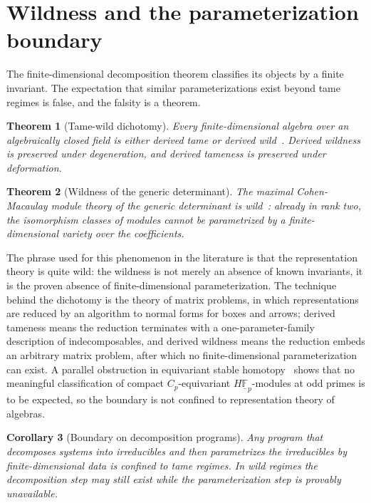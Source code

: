 \documentclass[11pt,letterpaper]{article}
\newtheorem{theorem}{Theorem}[section]
\newtheorem{corollary}[theorem]{Corollary}
\theoremstyle{definition}
\theoremstyle{remark}
\begin{document}
\section{Wildness and the parameterization boundary}

The finite-dimensional decomposition theorem classifies its objects by a finite invariant. The expectation that similar parameterizations exist beyond tame regimes is false, and the falsity is a theorem.

\begin{theorem}[Tame-wild dichotomy]
\label{thm:tame-wild}
Every finite-dimensional algebra over an algebraically closed field is either derived tame or derived wild~\cite{bekkert-drozd}. Derived wildness is preserved under degeneration, and derived tameness is preserved under deformation.
\end{theorem}

\begin{theorem}[Wildness of the generic determinant]
\label{thm:wild-generic-det}
The maximal Cohen-Macaulay module theory of the generic determinant is wild~\cite{buchweitz-leuschke}: already in rank two, the isomorphism classes of modules cannot be parametrized by a finite-dimensional variety over the coefficients.
\end{theorem}

The phrase used for this phenomenon in the literature is that the representation theory is quite wild: the wildness is not merely an absence of known invariants, it is the proven absence of finite-dimensional parameterization. The technique behind the dichotomy is the theory of matrix problems, in which representations are reduced by an algorithm to normal forms for boxes and arrows; derived tameness means the reduction terminates with a one-parameter-family description of indecomposables, and derived wildness means the reduction embeds an arbitrary matrix problem, after which no finite-dimensional parameterization can exist. A parallel obstruction in equivariant stable homotopy~\cite{grevstad-may} shows that no meaningful classification of compact $C_p$-equivariant $H\underline{\mathbb{F}}_p$-modules at odd primes is to be expected, so the boundary is not confined to representation theory of algebras.

\begin{corollary}[Boundary on decomposition programs]
\label{cor:boundary}
Any program that decomposes systems into irreducibles and then parametrizes the irreducibles by finite-dimensional data is confined to tame regimes. In wild regimes the decomposition step may still exist while the parameterization step is provably unavailable.
\end{corollary}
\end{document}
